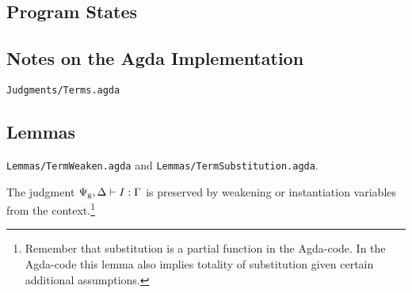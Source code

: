 \begin{mathpar}
\end{mathpar}

\subsection{Program States}

\begin{mathpar}
\end{mathpar}

\begin{mathpar}
\end{mathpar}

\subsection{Notes on the Agda Implementation}
\texttt{Judgments/Terms.agda}

\subsection{Lemmas}

\texttt{Lemmas/TermWeaken.agda} and \texttt{Lemmas/TermSubstitution.agda}.

\begin{lemma}
  \label{lemma:instructions-context}
  The judgment $\ofinstructions{\Psi_{\mathrm{g}}, \Delta}{\high I}{\Gamma}$ is
  preserved by weakening or instantiation variables
  from the context.\footnote{Remember that substitution is a partial function in
    the Agda-code. In the Agda-code this lemma also implies totality of
    substitution given certain additional assumptions.}
\end{lemma}

